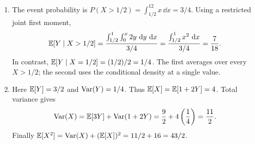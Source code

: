 \begin{enumerate}[label=\textbf{G\arabic*.},leftmargin=*,itemsep=1em]
\[
P(Y>1/8\mid X=1/2)=\int_{1/8}^{1/4}4\,\dd y=\frac12.
\]
\item The event probability is $P(X>1/2)=\int_{1/2}^12x\,\dd x=3/4$. Using a restricted joint first moment,
\[
\mathbb E[Y\mid X>1/2]
=\frac{\int_{1/2}^1\int_0^x2y\,\,\mathrm d y\,\,\mathrm d x}{3/4}
=\frac{\int_{1/2}^1x^2\,\,\mathrm d x}{3/4}
=\frac7{18}.
\]
In contrast, $\mathbb E[Y\mid X=1/2]=(1/2)/2=1/4$. The first averages over every $X>1/2$; the second uses the conditional density at a single value.
\item Here $\mathbb E[Y]=3/2$ and $\operatorname{Var}(Y)=1/4$. Thus $\mathbb E[X]=\mathbb E[1+2Y]=4$. Total variance gives
\[
\operatorname{Var}(X)=\mathbb E[3Y]+\operatorname{Var}(1+2Y)=\frac92+4\left(\frac14\right)=\frac{11}{2}.
\]
Finally $\mathbb E[X^2]=\operatorname{Var}(X)+(\mathbb E[X])^2=11/2+16=43/2$.
\end{enumerate}
